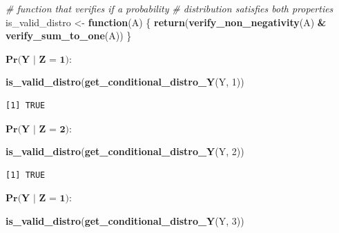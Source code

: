 \documentclass[
]{article}
\newenvironment{Shaded}{\begin{snugshade}}{\end{snugshade}}
\newcommand{\CommentTok}[1]{\textcolor[rgb]{0.56,0.35,0.01}{\textit{#1}}}
\newcommand{\ControlFlowTok}[1]{\textcolor[rgb]{0.13,0.29,0.53}{\textbf{#1}}}
\newcommand{\DecValTok}[1]{\textcolor[rgb]{0.00,0.00,0.81}{#1}}
\newcommand{\FunctionTok}[1]{\textcolor[rgb]{0.13,0.29,0.53}{\textbf{#1}}}
\newcommand{\NormalTok}[1]{#1}
\newcommand{\OtherTok}[1]{\textcolor[rgb]{0.56,0.35,0.01}{#1}}
\newcommand{\SpecialCharTok}[1]{\textcolor[rgb]{0.81,0.36,0.00}{\textbf{#1}}}
\begin{document}
\begin{Shaded}
\begin{Highlighting}[]
\CommentTok{\# function that verifies if a probability}
\CommentTok{\# distribution satisfies both properties}
\NormalTok{is\_valid\_distro }\OtherTok{\textless{}{-}} \ControlFlowTok{function}\NormalTok{(A) \{}
    \FunctionTok{return}\NormalTok{(}\FunctionTok{verify\_non\_negativity}\NormalTok{(A) }\SpecialCharTok{\&} \FunctionTok{verify\_sum\_to\_one}\NormalTok{(A))}
\NormalTok{\}}
\end{Highlighting}
\end{Shaded}

\vspace{0.5cm}

\(\textbf{Pr(Y | Z = 1)}\):

\begin{Shaded}
\begin{Highlighting}[]
\FunctionTok{is\_valid\_distro}\NormalTok{(}\FunctionTok{get\_conditional\_distro\_Y}\NormalTok{(Y, }\DecValTok{1}\NormalTok{))}
\end{Highlighting}
\end{Shaded}

\begin{verbatim}
[1] TRUE
\end{verbatim}

\vspace{0.5cm}

\(\textbf{Pr(Y | Z = 2)}\):

\begin{Shaded}
\begin{Highlighting}[]
\FunctionTok{is\_valid\_distro}\NormalTok{(}\FunctionTok{get\_conditional\_distro\_Y}\NormalTok{(Y, }\DecValTok{2}\NormalTok{))}
\end{Highlighting}
\end{Shaded}

\begin{verbatim}
[1] TRUE
\end{verbatim}

\vspace{0.5cm}

\(\textbf{Pr(Y | Z = 1)}\):

\begin{Shaded}
\begin{Highlighting}[]
\FunctionTok{is\_valid\_distro}\NormalTok{(}\FunctionTok{get\_conditional\_distro\_Y}\NormalTok{(Y, }\DecValTok{3}\NormalTok{))}
\end{Highlighting}
\end{Shaded}
\end{document}
